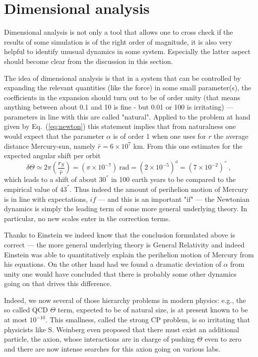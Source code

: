 \documentclass[12pt,ngerman,american]{iopart}
\begin{document}
\section{Dimensional analysis}\label{sec:analysis}

Dimensional analysis is not only a tool that allows one to cross check if the results of some simulation is of the right order of magnitude, it is also very helpful to identify unusual dynamics in some system.
Especially the latter aspect should become clear from the discussion in this section.

The idea of dimensional analysis is that in a system that can be controlled by expanding the relevant quantities (like the force) in some small parameter(s), the coefficients in the expansion should turn out to be of order unity (that means anything between about 0.1 and 10 is fine - but 0.01 or 100 is irritating) --- parameters in line with this are called "natural".
Applied to the problem at hand given by Eq.~(\ref{eq:newton}) this statement implies that from naturalness one would expect that the parameter $\alpha$ is of order 1 when one uses for $r$ the average distance Mercury-sun, namely $\bar r=6\times 10^7$ km.
From this one estimates for the expected angular shift per orbit
\begin{equation}
\delta \Theta \simeq 2\pi\left(\frac{r_S}{\bar r}\right) = (\pi \times 10^{-7}) \ \mbox{rad} = (2\times 10^{-5})^o = (7\times 10^{-2}) ^{''} \ ,
\end{equation}
which leads to a shift of about $30^{''}$ in 100 earth years to be compared to the empirical value of $43^{''}$.
Thus indeed the amount of perihelion motion of Mercury is in line with expectations, $if$ --- and this is an important "if" --- the Newtonian dynamics is simply the leading term of some more general underlying theory.
In particular, no new scales enter in the correction terms.

Thanks to Einstein we indeed know that the conclusion formulated above is correct --- the more general underlying theory is General Relativity and indeed Einstein was able to quantitatively explain the perihelion motion of Mercury from his equations. 
On the other hand had we found a dramatic deviation of $\alpha$ from unity one would have concluded that there is probably some other dynamics going on that drives this difference.

Indeed, we now several of those hierarchy problems in modern physics: e.g., the so called QCD $\Theta$ term, expected to be of natural size, is at present known to be at most $10^{-10}$.
This smallness, called the strong CP problem, is so irritating that physicists like S. Weinberg even proposed that there must exist an additional particle, the axion, whose interactions are in charge of pushing $\Theta$ even to zero and there are now intense searches for this axion going on various labs.
\end{document}

